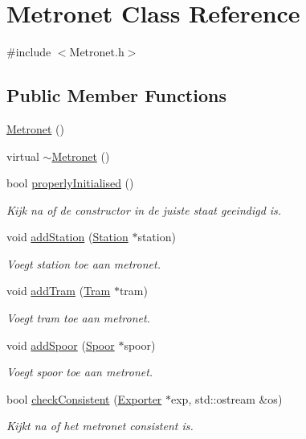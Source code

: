 \hypertarget{class_metronet}{}\section{Metronet Class Reference}
\label{class_metronet}


{\ttfamily \#include $<$Metronet.\+h$>$}

\subsection*{Public Member Functions}
\begin{DoxyCompactItemize}
\item 
\hyperlink{class_metronet_abdd205c39857ed1aabd104a6886cad45}{Metronet} ()
\item 
virtual \hyperlink{class_metronet_afa96be4bf66f8d7dcf3f40a7487d2ea7}{$\sim$\+Metronet} ()
\item 
bool \hyperlink{class_metronet_a3d2adce29a947f162924279b766de645}{properly\+Initialised} ()
\begin{DoxyCompactList}\small\item\em Kijk na of de constructor in de juiste staat geeindigd is. \end{DoxyCompactList}\item 
void \hyperlink{class_metronet_ac7f4069e577cd4dddb1e166923df3ecb}{add\+Station} (\hyperlink{class_station}{Station} $\ast$station)
\begin{DoxyCompactList}\small\item\em Voegt station toe aan metronet. \end{DoxyCompactList}\item 
void \hyperlink{class_metronet_a3a01132772f4a367d83af40a3c02e224}{add\+Tram} (\hyperlink{class_tram}{Tram} $\ast$tram)
\begin{DoxyCompactList}\small\item\em Voegt tram toe aan metronet. \end{DoxyCompactList}\item 
void \hyperlink{class_metronet_a499d8ac62450fec83bc10101de53cd76}{add\+Spoor} (\hyperlink{class_spoor}{Spoor} $\ast$spoor)
\begin{DoxyCompactList}\small\item\em Voegt spoor toe aan metronet. \end{DoxyCompactList}\item 
bool \hyperlink{class_metronet_abd223e3d0f745e3460a247dc667fce69}{check\+Consistent} (\hyperlink{class_exporter}{Exporter} $\ast$exp, std\+::ostream \&os)
\begin{DoxyCompactList}\small\item\em Kijkt na of het metronet consistent is. \end{DoxyCompactList}\end{DoxyCompactItemize}


